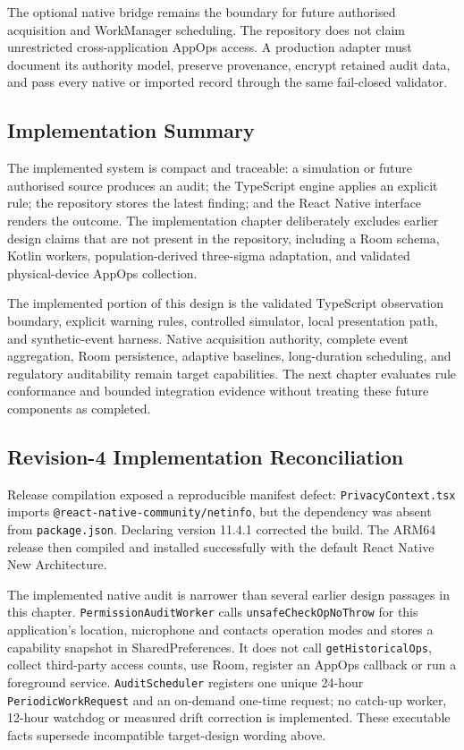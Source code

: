 The optional native bridge remains the boundary for future authorised acquisition and WorkManager scheduling. The repository does not claim unrestricted cross-application AppOps access. A production adapter must document its authority model, preserve provenance, encrypt retained audit data, and pass every native or imported record through the same fail-closed validator.

\subsection{Implementation Summary}

The implemented system is compact and traceable: a simulation or future authorised source produces an audit; the TypeScript engine applies an explicit rule; the repository stores the latest finding; and the React Native interface renders the outcome. The implementation chapter deliberately excludes earlier design claims that are not present in the repository, including a Room schema, Kotlin workers, population-derived three-sigma adaptation, and validated physical-device AppOps collection.

The implemented portion of this design is the validated TypeScript observation boundary, explicit warning rules, controlled simulator, local presentation path, and synthetic-event harness. Native acquisition authority, complete event aggregation, Room persistence, adaptive baselines, long-duration scheduling, and regulatory auditability remain target capabilities. The next chapter evaluates rule conformance and bounded integration evidence without treating these future components as completed.
\subsection{Revision-4 Implementation Reconciliation}

Release compilation exposed a reproducible manifest defect: \texttt{PrivacyContext.tsx} imports \texttt{@react-native-community/netinfo}, but the dependency was absent from \texttt{package.json}. Declaring version 11.4.1 corrected the build. The ARM64 release then compiled and installed successfully with the default React Native New Architecture.

The implemented native audit is narrower than several earlier design passages in this chapter. \texttt{PermissionAuditWorker} calls \texttt{unsafeCheckOpNoThrow} for this application's location, microphone and contacts operation modes and stores a capability snapshot in SharedPreferences. It does not call \texttt{getHistoricalOps}, collect third-party access counts, use Room, register an AppOps callback or run a foreground service. \texttt{AuditScheduler} registers one unique 24-hour \texttt{PeriodicWorkRequest} and an on-demand one-time request; no catch-up worker, 12-hour watchdog or measured drift correction is implemented. These executable facts supersede incompatible target-design wording above.

